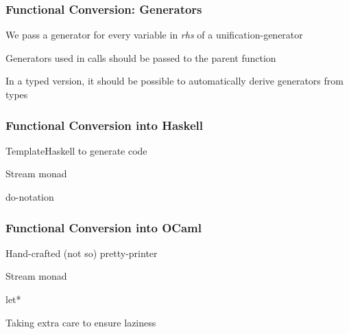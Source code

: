 \documentclass[xcolor=table, aspectratio=169]{beamer}
\begin{document}
\begin{frame}[fragile]
  \frametitle{Functional Conversion: Generators}
\begin{center}
We pass a generator for every variable in \emph{rhs} of a unification-generator
\end{center}

\begin{center}
Generators used in calls should be passed to the parent function
\end{center}

\begin{center}
In a typed version, it should be possible to automatically derive generators from types
\end{center}

    
\end{frame}

\begin{frame}[fragile]
  \frametitle{Functional Conversion into Haskell}
\begin{center}
  TemplateHaskell to generate code
\end{center}

\begin{center}
  Stream monad
\end{center}

\begin{center}
  do-notation
\end{center}

\begin{center}

\end{center}

\end{frame}

\begin{frame}[fragile]
  \frametitle{Functional Conversion into OCaml}
\begin{center}
  Hand-crafted (not so) pretty-printer
\end{center}

\begin{center}
  Stream monad
\end{center}

\begin{center}
  let*
\end{center}

\begin{center}
  Taking extra care to ensure laziness
\end{center}

\end{frame}
\end{document}
